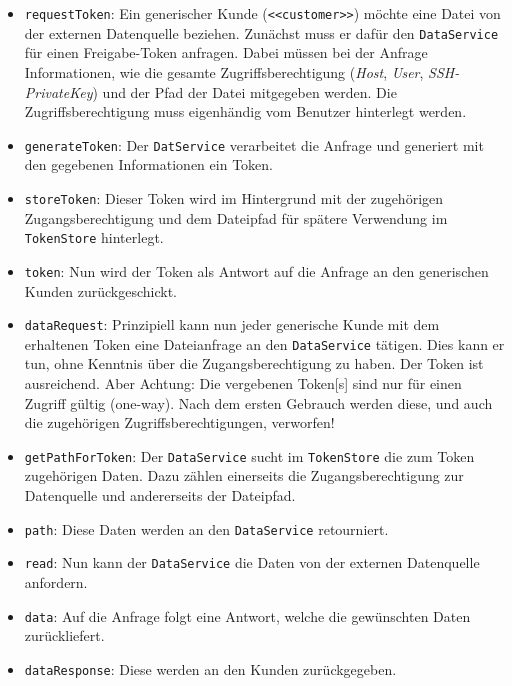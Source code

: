 \begin{itemize}
    \item \texttt{requestToken}: Ein generischer Kunde (\texttt{<<customer>>}) möchte eine Datei von der externen Datenquelle beziehen. Zunächst muss er dafür den \texttt{Da\-ta\-Ser\-vi\-ce} für einen Freigabe-\gls{Token} anfragen. Dabei müssen bei der Anfrage Informationen, wie die gesamte Zugriffsberechtigung (\textit{Host}, \textit{User}, \textit{SSH-PrivateKey}) und der Pfad der Datei mitgegeben werden. Die Zugriffsberechtigung muss eigenhändig vom Benutzer hinterlegt werden.
    
    \item \texttt{generateToken}: Der \texttt{DatService} verarbeitet die Anfrage und generiert mit den gegebenen Informationen ein \gls{Token}.
    
    \item \texttt{storeToken}: Dieser \gls{Token} wird im Hintergrund mit der zu\-ge\-höri\-gen Zugangsberechtigung und dem Dateipfad für spätere Verwendung im \texttt{TokenStore} hinterlegt.
    
    \item \texttt{token}: Nun wird der \gls{Token} als Antwort auf die Anfrage an den generischen Kunden zurückgeschickt.
    
    \item \texttt{dataRequest}: Prinzipiell kann nun jeder generische Kunde mit dem erhaltenen \gls{Token} eine Dateianfrage an den \texttt{DataService} tätigen. Dies kann er tun, ohne Kenntnis über die Zugangsberechtigung zu haben. Der \gls{Token} ist ausreichend. Aber Achtung: Die vergebenen \gls{Token}[s] sind nur für einen Zugriff gültig (one-way). Nach dem ersten Gebrauch werden diese, und auch die zugehörigen Zugriffsberechtigungen, verworfen!
    \item \texttt{getPathForToken}: Der \texttt{DataService} sucht im \texttt{TokenStore} die zum \gls{Token} zu\-ge\-hör\-igen Daten. Dazu zählen einerseits die Zugangsberechtigung zur Datenquelle und andererseits der Dateipfad.
    
    \item \texttt{path}: Diese Daten werden an den \texttt{DataService} retourniert.
    \item \texttt{read}: Nun kann der \texttt{DataService} die Daten von der externen Datenquelle anfordern.
    \item \texttt{data}: Auf die Anfrage folgt eine Antwort, welche die ge\-wünsch\-ten Daten zurückliefert.
    \item \texttt{dataResponse}: Diese werden an den Kunden zurückgegeben.

\end{itemize}


